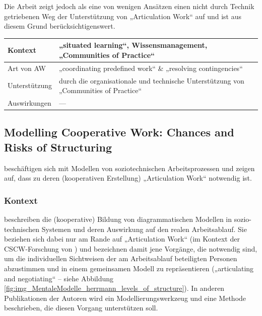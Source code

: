 Die Arbeit zeigt jedoch als eine von wenigen Ansätzen einen nicht durch Technik getriebenen Weg der Unterstützung von „Articulation Work“ auf und ist aus diesem Grund berücksichtigenswert.
\\[1em]
\begin{tabular}{| p{3cm} | p{10cm} |}
  \hline
  Kontext & „situated learning“, Wissensmanagement, „Communities of Practice“ \\ \hline
  Art von AW & „coordinating predefined work“ \& „resolving contingencies“ \\ \hline
  Unterstützung & durch die organisationale und technische Unterstützung von „Communities of Practice“ \\ \hline
  Auswirkungen & --- \\ \hline
\end{tabular}

\subsection{Modelling Cooperative Work: Chances and Risks of Structuring}
\label{sub:modelling_cooperative_work}

\citet{Herrmann02} beschäftigen sich mit Modellen von soziotechnischen Arbeitsprozessen und zeigen auf, dass zu deren (kooperativen Erstellung) „Articulation Work“ notwendig ist. 

\subsubsection{Kontext}

\citet{Herrmann02} beschreiben die (kooperative) Bildung von diagrammatischen Modellen in sozio-technischen Systemen und deren Auswirkung auf den realen Arbeitsablauf. Sie beziehen sich dabei nur am Rande auf „Articulation Work“ (im Kontext der \gls{CSCW}-Forschung von \citet{Schmidt92}) und bezeichnen damit jene Vorgänge, die notwendig sind, um die individuellen Sichtweisen der am Arbeitsablauf beteiligten Personen abzustimmen und in einem gemeinsamen Modell zu repräsentieren („articulating and negotiating“ -- siehe Abbildung \ref{fig:img_MentaleModelle_herrmann_levels_of_structure}). In anderen Publikationen der Autoren wird ein Modellierungswerkzeug \citep{Herrmann04a} und eine Methode \citep{Herrmann04} beschrieben, die diesen Vorgang unterstützen soll.

